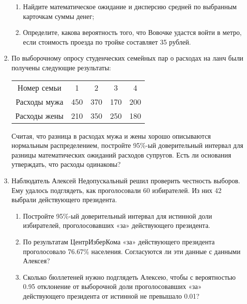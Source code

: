 \begin{enumerate}[resume]
	 \begin{enumerate}
		\item Найдите математическое ожидание и дисперсию средней по выбранным карточкам суммы денег;
		\item Определите, какова вероятность того, что Вовочке удастся войти в метро, если стоимость проезда по тройке составляет 35 рублей.
	\end{enumerate}

	\item По выборочному опросу студенческих семейных пар о расходах на ланч были получены следующие результаты:

	\begin{center}
		\begin{tabular}{ccccc}
			\toprule
			Номер семьи & 1 & 2 & 3 & 4\\
			Расходы мужа & 450 & 370 & 170 & 200\\
			Расходы жены & 210 & 350 & 250 & 180\\
			\bottomrule
		\end{tabular}
	\end{center}

	Считая, что разница в расходах мужа и жены хорошо описываются нормальным распределением, постройте 95\%-ый доверительный интервал для разницы математических ожиданий расходов супругов. Есть ли основания утверждать, что расходы одинаковы?

	\item Наблюдатель Алексей Недопускальный решил проверить честность выборов. Ему удалось подглядеть, как проголосовали 60 избирателей. Из них 42 выбрали действующего президента.

	\begin{enumerate}
		\item Постройте 95\%-ый доверительный интервал для истинной доли избирателей, проголосовавших «за» действующего президента.
		\item По результатам ЦентрИзберКома «за» действующего президента проголосовало 76.67\% населения. Согласуются ли эти данные с данными Алексея?
		\item Сколько бюллетеней нужно подглядеть Алексею, чтобы с вероятностью 0.95 отклонение от выборочной доли проголосовавших «за» действующего президента от истинной не превышало 0.01?
	\end{enumerate}

\end{enumerate}
